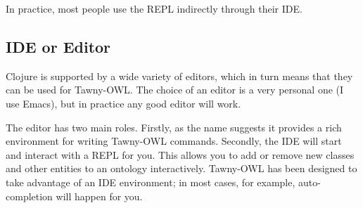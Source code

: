 In practice, most people use the REPL indirectly through their IDE.

\subsection{IDE or Editor}
\label{sec-3-5}

Clojure is supported by a wide variety of editors, which in turn means
that they can be used for Tawny-OWL. The choice of an editor is a very
personal one (I use Emacs), but in practice any good editor will work.

The editor has two main roles. Firstly, as the name suggests it provides
a rich environment for writing Tawny-OWL commands. Secondly, the IDE
will start and interact with a REPL for you. This allows you to add or
remove new classes and other entities to an ontology interactively.
Tawny-OWL has been designed to take advantage of an IDE environment; in
most cases, for example, auto-completion will happen for you.





